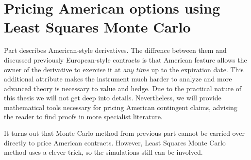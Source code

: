 \documentclass[a4paper,11pt, twoside]{book}
\theoremstyle{definition}
\theoremstyle{remark}
\begin{document}
\chapter[{Pricing American options using Least Squares Monte Carlo}]{Pricing American options using \\Least Squares Monte Carlo}
\label{chapter:pricingAmerican}
Part  describes American-style derivatives. The diffrence between them and discussed previously European-style contracts is that American feature allows the owner of the derivative to exercise it at \emph{any time} up to the expiration date. This additional attribute makes the instrument much harder to analyze and more advanced theory is necessary to value and hedge.
Due to the practical nature of this thesis we will not get deep into details. Nevertheless, we will provide mathematical tools necessary for pricing American contingent claims, advising the reader to find proofs in more specialist literature. 

It turns out that Monte Carlo method from previous part cannot be carried over directly to price American contracts. However, Least Squares Monte Carlo method uses a clever trick, so the simulations still can be involved. 
\end{document}
